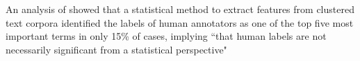 An analysis of \cite{Carmel2009} showed that a statistical method to extract features from clustered text corpora identified the labels of human annotators as one of the top five most important terms in only 15\% of cases, implying ``that human labels are not necessarily significant from a statistical perspective" \cite[139]{Carmel2009}
